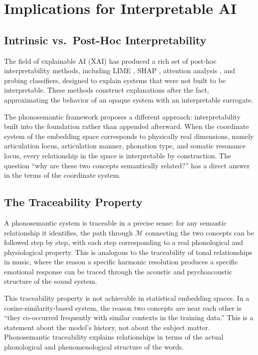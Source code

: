 \documentclass[12pt]{article}
\begin{document}
\section{Implications for Interpretable AI}

\subsection{Intrinsic vs.\ Post-Hoc Interpretability}

The field of explainable AI (XAI) has produced a rich set of post-hoc interpretability methods, including LIME \cite{ribeiro2016}, SHAP \cite{lundberg2017}, attention analysis \cite{jain2019}, and probing classifiers, designed to explain systems that were not built to be interpretable. These methods construct explanations after the fact, approximating the behavior of an opaque system with an interpretable surrogate.

The phonosemantic framework proposes a different approach: interpretability built into the foundation rather than appended afterward. When the coordinate system of the embedding space corresponds to physically real dimensions, namely articulation locus, articulation manner, phonation type, and somatic resonance locus, every relationship in the space is interpretable by construction. The question ``why are these two concepts semantically related?'' has a direct answer in the terms of the coordinate system.

\subsection{The Traceability Property}

A phonosemantic system is traceable in a precise sense: for any semantic relationship it identifies, the path through $\mathcal{M}$ connecting the two concepts can be followed step by step, with each step corresponding to a real phonological and physiological property. This is analogous to the traceability of tonal relationships in music, where the reason a specific harmonic resolution produces a specific emotional response can be traced through the acoustic and psychoacoustic structure of the sound system.

This traceability property is not achievable in statistical embedding spaces. In a cosine-similarity-based system, the reason two concepts are near each other is ``they co-occurred frequently with similar contexts in the training data.'' This is a statement about the model's history, not about the subject matter. Phonosemantic traceability explains relationships in terms of the actual phonological and phenomenological structure of the words.
\end{document}
